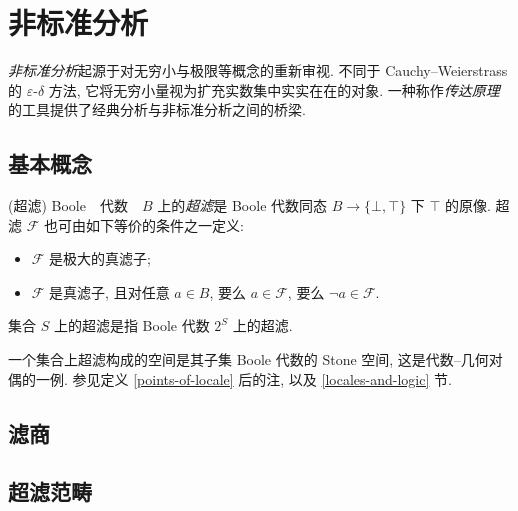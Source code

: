 \section{非标准分析}


\emph{非标准分析}起源于对无穷小与极限等概念的重新审视. 不同于 Cauchy--Weierstrass 的 $\varepsilon$-$\delta$ 方法, 它将无穷小量视为扩充实数集中实实在在的对象. 一种称作\emph{传达原理}的工具提供了经典分析与非标准分析之间的桥梁.

\subsection{基本概念}

\begin{definition}
	{(超滤)}
	Boole　代数　$B$ 上的\emph{超滤}是 Boole 代数同态 $B\to \{\bot,\top\}$ 下 $\top$ 的原像. 超滤 $\mathcal F$ 也可由如下等价的条件之一定义:
	\begin{itemize}
		\item $\mathcal F$ 是极大的真滤子;
		\item $\mathcal F$ 是真滤子, 且对任意 $a\in B$, 要么 $a\in\mathcal F$, 要么 $\neg a\in \mathcal F$.
	\end{itemize}
	集合 $S$ 上的超滤是指 Boole 代数 $2^S$ 上的超滤.
\end{definition}

\begin{remark}
	{}
	一个集合上超滤构成的空间是其子集 Boole 代数的 Stone 空间, 这是代数--几何对偶的一例. 参见定义 \ref{points-of-locale} 后的注, 以及 \ref{locales-and-logic} 节.
\end{remark}

\subsection{滤商}

\subsection{超滤范畴}

\todo{}